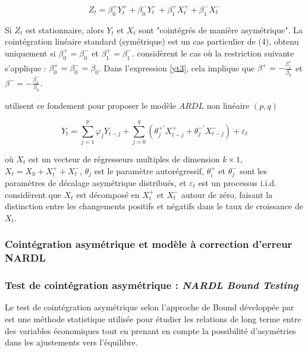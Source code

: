 \begin{equation}
     Z_t = \beta^+_0 Y_t^+ + \beta^-_0 Y_t^- + \beta^+_1 X_t^+ + \beta^-_1 X_t^-
     \label{yt3}
\end{equation}

Si \( Z_t \) est stationnaire, alors \( Y_t \) et \( X_t \) sont "cointégrés de manière asymétrique". La cointégration linéaire standard (symétrique) est un cas particulier de (4), obtenu uniquement si \( \beta^+_0 = \beta^-_0 \) et \( \beta^+_1 = \beta^-_1 \). \cite{Shin} considèrent le cas où la restriction suivante s'applique : \( \beta^+_0 = \beta^-_0 = \beta_0 \). Dans l'expression \eqref{yt3}, cela implique que \( \beta^+ = -\frac{\beta^+_1}{\beta_0} \) et \( \beta^- = -\frac{\beta^-_1}{\beta_0} \).

\cite{Shin} utilisent ce fondement pour proposer le modèle $ARDL$ non linéaire $(p,q)$

\begin{equation}
    Y_t = \sum_{j=1}^p \varphi_j Y_{t-j} + \sum_{j=0}^q \left (\theta_j^{+'} X_{t-j}^+ +\theta_j^{-'} X_{t-j}^- \right ) +\varepsilon_t 
\end{equation}

où \( X_t \) est un vecteur de régresseurs multiples de dimension \( k \times 1 \), \( X_t = X_0 + X_t^+ + X_t^- \), \( \theta_j \) est le paramètre autorégressif, \( \theta_{i}^+ \) et \( \theta_{j}^- \) sont les paramètres de décalage asymétrique distribués, et \( \varepsilon_t \) est un processus i.i.d. \cite{Shin} considèrent que \( X_t \) est décomposé en \( X_t^+ \) et \( X_t^- \) autour de zéro, faisant la distinction entre les changements positifs et négatifs dans le taux de croissance de \( X_t \).

\subsubsection{\textsf{Cointégration asymétrique et modèle à correction d'erreur NARDL}}

\subsubsection*{\textsf{Test de cointégration asymétrique : \textit{NARDL Bound Testing}}}

Le test de cointégration asymétrique selon l'approche de Bound développée par \cite{Pesaran et Shin} est une méthode statistique utilisée pour étudier les relations de long terme entre des variables économiques tout en prenant en compte la possibilité d'asymétries dans les ajustements vers l'équilibre.\\

